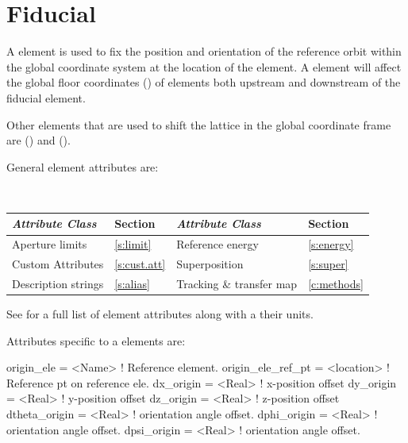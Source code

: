 \section{Fiducial}
\label{s:fiducial}

A  element is used to fix the position and orientation of the reference orbit within
the global coordinate system at the location of the  element. A  element
will affect the global floor coordinates () of elements both upstream and downstream
of the fiducial element.

Other elements that are used to shift the lattice in the global coordinate frame are
 () and  ().

General  element attributes are:
\begin{center}
\tt
\begin{tabular}{llll} \toprule
  {\sl Attribute Class}      & Section           & {\sl Attribute Class}      & Section         \\ \midrule
  Aperture limits            & \ref{s:limit}     & Reference energy           & \ref{s:energy}  \\
  Custom Attributes          & \ref{s:cust.att}  & Superposition              & \ref{s:super}   \\
  Description strings        & \ref{s:alias}     & Tracking \& transfer map   & \ref{c:methods} \\ 
  \bottomrule
\end{tabular}
\end{center}
\toffset
See  for a full list of element attributes along with a their units.

Attributes specific to a  elements are:
\begin{example}
  origin_ele        = <Name>     ! Reference element.
  origin_ele_ref_pt = <location> ! Reference pt on reference ele.
  dx_origin         = <Real>     ! x-position offset
  dy_origin         = <Real>     ! y-position offset
  dz_origin         = <Real>     ! z-position offset
  dtheta_origin     = <Real>     ! orientation angle offset.
  dphi_origin       = <Real>     ! orientation angle offset.
  dpsi_origin       = <Real>     ! orientation angle offset.
\end{example}

